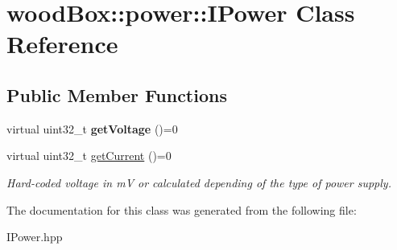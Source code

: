 \hypertarget{classwood_box_1_1power_1_1_i_power}{}\section{wood\+Box\+:\+:power\+:\+:I\+Power Class Reference}
\label{classwood_box_1_1power_1_1_i_power}
\subsection*{Public Member Functions}
\begin{DoxyCompactItemize}
\item 
\mbox{\label{classwood_box_1_1power_1_1_i_power_a67086e56aca8cb46033a441b3f4e11aa}} 
virtual uint32\+\_\+t {\bfseries get\+Voltage} ()=0
\item 
\mbox{\label{classwood_box_1_1power_1_1_i_power_a9b3e0363c22d3064bd7ccc8663f1a033}} 
virtual uint32\+\_\+t \mbox{\hyperlink{classwood_box_1_1power_1_1_i_power_a9b3e0363c22d3064bd7ccc8663f1a033}{get\+Current}} ()=0
\begin{DoxyCompactList}\small\item\em Hard-\/coded voltage in mV or calculated depending of the type of power supply. \end{DoxyCompactList}\end{DoxyCompactItemize}


The documentation for this class was generated from the following file\+:\begin{DoxyCompactItemize}
\item 
I\+Power.\+hpp\end{DoxyCompactItemize}
